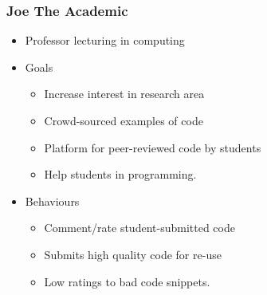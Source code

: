 \documentclass[handout, t]{beamer}
\begin{document}
\begin{frame}
\frametitle{Joe The Academic}
\begin{itemize}
\item Professor lecturing in computing
\item Goals
    \begin{itemize}
    \item Increase interest in research area
    \item Crowd-sourced examples of code
    \item Platform for peer-reviewed code by students
    \item Help students in programming.
    \end{itemize}
\item Behaviours
    \begin{itemize}
    \item Comment/rate student-submitted code
    \item Submits high quality code for re-use
    \item Low ratings to bad code snippets.
    \end{itemize}
\end{itemize}
\end{frame}





\end{document}
